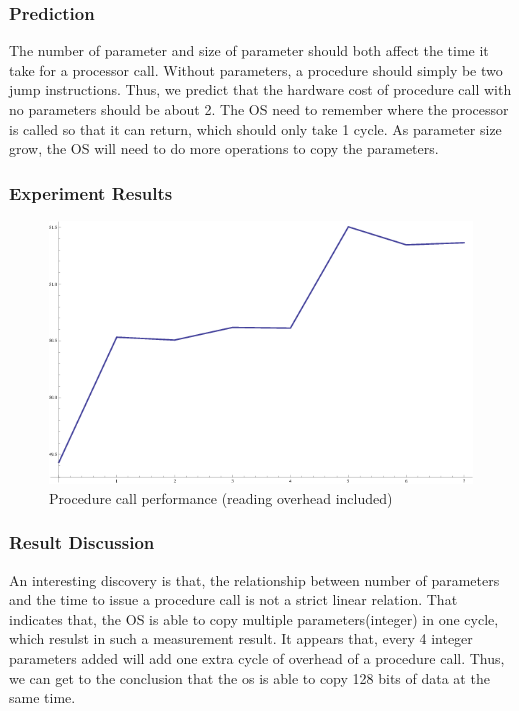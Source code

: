 \documentclass{article} %
\begin{document}
\subsubsection{Prediction}
The number of parameter and size of parameter should both affect the time it
take for a processor call. Without parameters, a procedure should simply be two
jump instructions. Thus, we predict that the hardware cost of procedure call
with no parameters should be about 2. The OS need to remember where the
processor is called so that it can return, which should only take 1 cycle. As
parameter size grow, the OS will need to do more operations to copy the
parameters.

\subsubsection{Experiment Results}

\begin{figure}[!htb]
\centering
\includegraphics[scale=.6]{proc.png}
\caption{Procedure call performance (reading overhead included)}
\label{fig:proc}
\end{figure}

\subsubsection{Result Discussion}
An interesting discovery is that, the relationship between number of
parameters and the time to issue a procedure call is not a strict linear
relation. That indicates that, the OS is able to copy multiple
parameters(integer) in one cycle, which resulst in such a measurement result.
It appears that, every 4 integer parameters added will add one extra cycle of
overhead of a procedure call. Thus, we can get to the conclusion that the os
is able to copy 128 bits of data at the same time.
\end{document}
